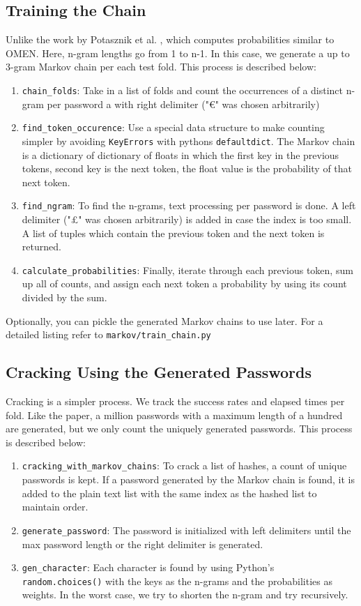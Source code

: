 \subsection{Training the Chain}
Unlike the work by Potasznik et al. \cite{Max}, which computes probabilities similar to OMEN. Here, n-gram lengths go from 1 to n-1. In this case, we generate a up to 3-gram Markov chain per each test fold. This process is described below:

\begin{enumerate}
  \item \verb|chain_folds|: Take in a list of folds and count the occurrences of a distinct n-gram per password a with right delimiter ("€" was chosen arbitrarily)
  \item \verb|find_token_occurence|: Use a special data structure to make counting simpler by avoiding \verb|KeyErrors| with pythons \verb|defaultdict|. The Markov chain is a dictionary of dictionary of floats in which the first key in the previous tokens, second key is the next token, the float value is the probability of that next token.   
  \item \verb|find_ngram|: To find the n-grams, text processing per password is done. A left delimiter ("£" was chosen arbitrarily) is added in case the index is too small. A list of tuples which contain the previous token and the next token is returned.
  \item \verb|calculate_probabilities|: Finally, iterate through each previous token, sum up all of counts, and assign each next token a probability by using its count divided by the sum.
\end{enumerate}

Optionally, you can pickle the generated Markov chains to use later. For a detailed listing refer to \verb|markov/train_chain.py|

\subsection{Cracking Using the Generated Passwords}
Cracking is a simpler process. We track the success rates and elapsed times per fold. Like the paper, a million passwords with a maximum length of a hundred are generated, but we only count the uniquely generated passwords. This process is described below:

\begin{enumerate}
  \item \verb|cracking_with_markov_chains|: To crack a list of hashes, a count of unique passwords is kept. If a password generated by the Markov chain is found, it is added to the plain text list with the same index as the hashed list to maintain order. 
  \item \verb|generate_password|: The password is initialized with left delimiters until the max password length or the right delimiter is generated.
  \item\verb|gen_character|: Each character is found by using Python's \verb|random.choices()| with the keys as the n-grams and the probabilities as weights. In the worst case, we try to shorten the n-gram and try recursively. 
\end{enumerate}

